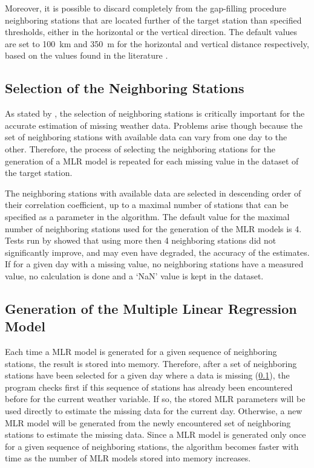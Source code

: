 \documentclass[TechnicalNoteMeteo.tex]{subfiles}
\begin{document}
Moreover, it is possible to discard completely from the gap-filling procedure neighboring stations that are located further of the target station than specified thresholds, either in the horizontal or the vertical direction. The default values are set to \SI{100}{km} and \SI{350}{m} for the horizontal and vertical distance respectively, based on the values found in the literature \cite{tronci_comparison_1986,xia_forest_1999,simolo_improving_2010}.

\subsection{Selection of the Neighboring Stations}\label{sec:select_stations}

As stated by \cite{eischeid_creating_2000}, the selection of neighboring stations is critically important for the accurate estimation of missing weather data. Problems arise though because the set of neighboring stations with available data can vary from one day to the other. Therefore, the process of selecting the neighboring stations for the generation of a MLR model is repeated for each missing value in the dataset of the target station. 

The neighboring stations with available data are selected in descending order of their correlation coefficient, up to a maximal number of stations that can be specified as a parameter in the algorithm. The default value for the maximal number of neighboring stations used for the generation of the MLR models is 4. Tests run by \cite{eischeid_creating_2000} showed that using more then 4 neighboring stations did not significantly improve, and may even have degraded, the accuracy of the estimates. If for a given day with a missing value, no neighboring stations have a measured value, no calculation is done and a ‘NaN' value is kept in the dataset. 

\subsection{Generation of the Multiple Linear Regression Model}\label{subsec:MLR_gen}

Each time a MLR model is generated for a given sequence of neighboring stations, the result is stored into memory. Therefore, after a set of neighboring stations have been selected for a given day where a data is missing (\cref{sec:select_stations}), the program checks first if this sequence of stations has already been encountered before for the current weather variable. If so, the stored MLR parameters will be used directly to estimate the missing data for the current day. Otherwise, a new MLR model will be generated from the newly encountered set of neighboring stations to estimate the missing data. Since a MLR model is generated only once for a given sequence of neighboring stations, the algorithm becomes faster with time as the number of MLR models stored into memory increases.
\end{document}
